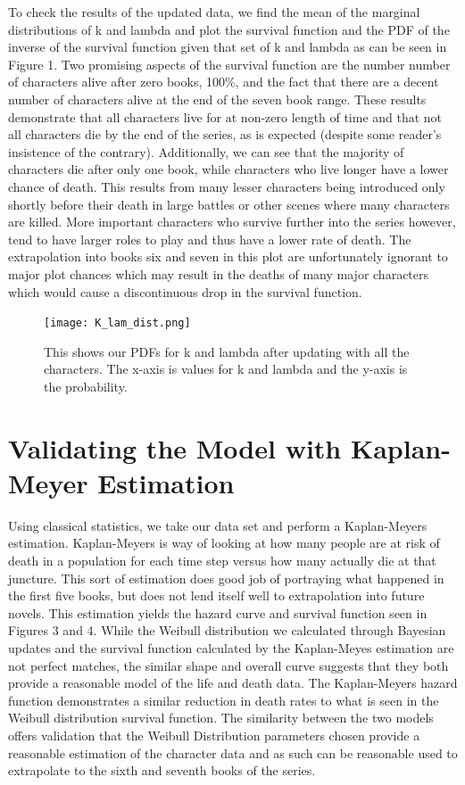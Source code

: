 \documentclass{article}
\begin{document}
To check the results of the updated data, we find the mean of the marginal distributions of k and lambda and plot the survival function and the PDF of the inverse of the survival function given that set of k and lambda as can be seen in Figure 1. Two promising aspects of the survival function are the number number of characters alive after zero books, 100\%, and the fact that there are a decent number of characters alive at the end of the seven book range. These results demonstrate that all characters live for at non-zero length of time and that not all characters die by the end of the series, as is expected (despite some reader's insistence of the contrary). Additionally, we can see that the majority of characters die after only one book, while characters who live longer have a lower chance of death. This results from many lesser characters being introduced only shortly before their death in large battles or other scenes where many characters are killed. More important characters who survive further into the series however, tend to have larger roles to play and thus have a lower rate of death. The extrapolation into books six and seven in this plot are unfortunately ignorant to major plot chances which may result in the deaths of many major characters which would cause a discontinuous drop in the survival function.

\begin{figure}[ht!]
\centering
\texttt{[image: K\_lam\_dist.png]}
\caption{This shows our PDFs for k and lambda after updating with all the characters.  The x-axis is values for k and lambda and the y-axis is the probability.}
\end{figure}

\section{Validating the Model with Kaplan-Meyer Estimation}
Using classical statistics, we take our data set and perform a Kaplan-Meyers estimation. Kaplan-Meyers is way of looking at how many people are at risk of death in a population for each time step versus how many actually die at that juncture. This sort of estimation does good job of portraying what happened in the first five books, but does not lend itself well to extrapolation into future novels. This estimation yields the hazard curve and survival function seen in Figures 3 and 4. While the Weibull distribution we calculated through Bayesian updates and the survival function calculated by the Kaplan-Meyes estimation are not perfect matches, the similar shape and overall curve suggests that they both provide a reasonable model of the life and death data. The Kaplan-Meyers hazard function demonstrates a similar reduction in death rates to what is seen in the Weibull distribution survival function. The similarity between the two models offers validation that the Weibull Distribution parameters chosen provide a reasonable estimation of the character data and as such can be reasonable used to extrapolate to the sixth and seventh books of the series. 
\end{document}
